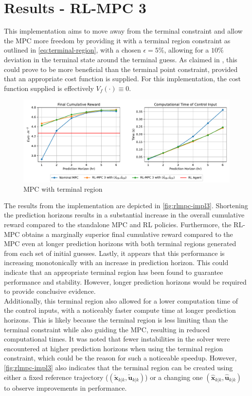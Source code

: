 \section{Results - RL-MPC 3}
This implementation aims to move away from the terminal constraint and allow the MPC more freedom by providing it with a terminal region constraint as outlined in \autoref{eq:terminal-region}, with a chosen $\epsilon = 5\%$, allowing for a $10\%$ deviation in the terminal state around the terminal guess. As claimed in \cite{amritEconomicOptimizationUsing2011}, this could prove to be more beneficial than the terminal point constraint, provided that an appropriate cost function is supplied. For this implementation, the cost function supplied is effectively $V_f(\cdot) \equiv 0$. 


\begin{figure}[H]
	\centering
	\includegraphics[width=\textwidth]{figures/rl_mpc_impl_3.pdf}
	\caption{MPC with terminal region}
	\label{fig:rlmpc-impl3}
\end{figure}

The results from the implementation are depicted in \autoref{fig:rlmpc-impl3}. Shortening the prediction horizons results in a substantial increase in the overall cumulative reward compared to the standalone MPC and RL policies. Furthermore, the RL-MPC obtains a marginally superior final cumulative reward compared to the MPC even at longer prediction horizons with both terminal regions generated from each set of initial guesses. Lastly, it appears that this performance is increasing monotonically with an increase in prediction horizon. This could indicate that an appropriate terminal region has been found to  guarantee performance and stability. However, longer prediction horizons would be required to provide conclusive evidence.\\

Additionally, this terminal region also allowed for a lower computation time of the control inputs, with a noticeably faster compute time at longer prediction horizons. This is likely because the terminal region is less limiting than the terminal constraint while also guiding the MPC, resulting in reduced computational times. It was noted that fewer instabilities in the solver were encountered at higher prediction horizons when using the terminal region constraint, which could be the reason for such a noticeable speedup. However, \autoref{fig:rlmpc-impl3} also indicates that the terminal region can be created using either a fixed reference trajectory ($(\tilde{\mathbf{x}}_{k|k}, \tilde{\mathbf{u}}_{k|k})$) or a changing one $(\hat{\mathbf{x}}_{k|k}, \hat{\mathbf{u}}_{k|k})$ to observe improvements in performance. 

